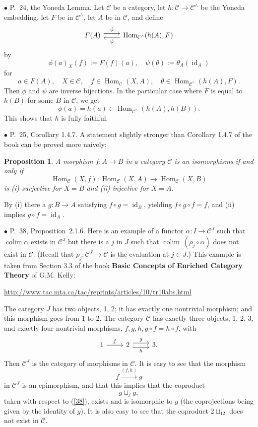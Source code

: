 \documentclass[12pt]{article}
\newtheorem{prop}[thm]{Proposition}
\theoremstyle{remark}%
\newcommand{\bu}{\bullet}
\newcommand{\n}{\noindent}
\newcommand{\C}{\mathcal C}
\newcommand{\bp}{\begin{prop}}
\newcommand{\ep}{\end{prop}}
\newcommand{\pr}{Proposition}
\DeclareMathOperator*{\co}{colim}
\DeclareMathOperator{\id}{id}
\DeclareMathOperator{\Hom}{Hom}
\begin{document}

\n$\bu$ P.~24, the Yoneda Lemma. Let $\C$ be a category, let $h:\C\to\C^\wedge$ be the Yoneda embedding, let $F$ be in $\C^\wedge$, let $A$ be in $\C$, and define 
$$
\begin{tikzcd} 
F(A)\ar[yshift=0.7ex]{r}{\phi}&\Hom_{\C^\wedge}(h(A),F)\ar[yshift=-0.7ex]{l}{\psi}
\end{tikzcd}
$$
by 
$$
\phi(a)_X(f):=F(f)(a),\quad\psi(\theta):=\theta_A(\id_A)
$$
for 
$$
a\in F(A),\quad X\in\C,\quad f\in\Hom_\C(X,A),\quad\theta\in\Hom_{\C^\wedge}(h(A),F).
$$ 
Then $\phi$ and $\psi$ are inverse bijections. In the particular case where $F$ is equal to $h(B)$ for some $B$ in $\C$, we get 
$$
\phi(a)=h(a)\in\Hom_{\C^\wedge}(h(A),h(B)).
$$
This shows that $h$ is fully faithful. 


\n$\bu$ P.~25, Corollary 1.4.7. A statement slightly stronger than Corollary 1.4.7 of the book can be proved more naively:
% 
\bp
A morphism $f:A\to B$ in a category $\C$ is an isomorphisms if and only if 
$$
\Hom_\C(X,f):\Hom_\C(X,A)\to\Hom_\C(X,B)
$$
is (i) surjective for $X=B$ and (ii) injective for $X=A$.
\ep
%
\n{\em Proof.} By (i) there a $g:B\to A$ satisfying $f\circ g=\id_B$, yielding $f\circ g\circ f=f$, and (ii) implies $g\circ f=\id_A$. 


\n$\bu$ P.~38, \pr\ 2.1.6. Here is an example of a functor $\alpha:I\to\C^J$ such that $\co\alpha$ exists in $\C^J$ but there is a $j$ in $J$ such that $\co\ (\rho_j\circ\alpha)$ does not exist in $\C$. (Recall that $\rho_j:\C^J\to\C$ is the evaluation at $j\in J$.) This example is taken from Section 3.3 of the book \textbf{Basic Concepts of Enriched Category Theory} of G.M. Kelly:\medskip 

\centerline{\href{http://www.tac.mta.ca/tac/reprints/articles/10/tr10abs.html}{http://www.tac.mta.ca/tac/reprints/articles/10/tr10abs.html}}

The category $J$ has two objects, 1, 2; it has exactly one nontrivial morphism; and this morphism goes from 1 to 2. The category $\C$ has exactly three objects, 1, 2, 3, and exactly four nontrivial morphisms, $f,g,h,g\circ f=h\circ f$, with 
$$
\begin{tikzcd}
1\ar{r}{f}&2\ar[yshift=.7ex]{r}{g}\ar[yshift=-.7ex]{r}[swap]{h}&3.
\end{tikzcd}
$$ 
Then $\C^J$ is the category of morphisms in $\C$. It is easy to see that the morphism 
%
\begin{equation}\label{38}
f\xrightarrow{(f,h)}g 
\end{equation}
%
in $\C^J$ is an epimorphism, and that this implies that the coproduct 
$$
g\sqcup_fg,
$$ 
taken with respect to (\ref{38}), exists and is isomorphic to $g$ (the coprojections being given by the identity of $g$). It is also easy to see that the coproduct $2\sqcup_12$ does not exist in $\C$. 
\end{document}
